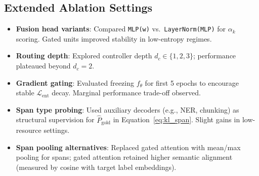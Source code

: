 \subsection{Extended Ablation Settings}
\label{sec:ablation-settings}
\begin{itemize}[leftmargin=1.5em]
  \item \textbf{Fusion head variants}: Compared \texttt{MLP(w)} vs.\ \texttt{LayerNorm(MLP)} for $\alpha_k$ scoring. Gated units improved stability in low-entropy regimes.
  \item \textbf{Routing depth}: Explored controller depth $d_c \in \{1, 2, 3\}$; performance plateaued beyond $d_c = 2$.
  \item \textbf{Gradient gating}: Evaluated freezing $f_\theta$ for first 5 epochs to encourage stable $\mathcal{L}_{\mathrm{ent}}$ decay. Marginal performance trade-off observed.
  \item \textbf{Span type probing}: Used auxiliary decoders (e.g., NER, chunking) as structural supervision for $\hat{P}_{\mathrm{gold}}$ in Equation~\eqref{eq:kl_span}. Slight gains in low-resource settings.
  \item \textbf{Span pooling alternatives}: Replaced gated attention with mean/max pooling for spans; gated attention retained higher semantic alignment (measured by cosine with target label embeddings).
\end{itemize}
